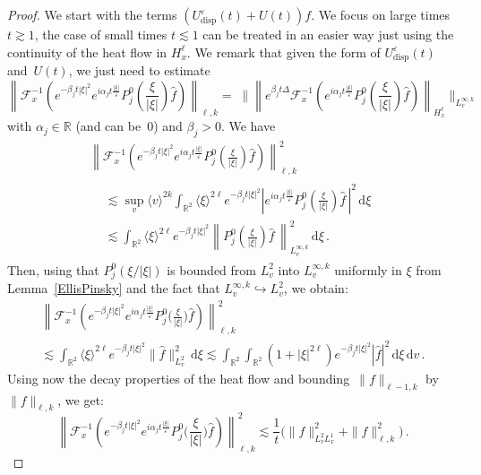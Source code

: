 \documentclass[11pt]{article}
\theoremstyle{definition}
\numberwithin{equation}{section}
\numberwithin{figure}{section}
\numberwithin{table}{section}
\newcommand*{\dd}{\mathrm{d}}
\newcommand*{\dv}{\dd v}
\newcommand*{\dxi}{\dd \xi}
\newcommand*\R {\mathbb{R}}
\newcommand*\eps{{\varepsilon}}
\DeclareMathOperator{\disp}{disp}
\begin{document}
\begin{proof}
We start with the terms $(U^\eps_{\disp}(t)+U(t))f$. We focus on large times~$t \gtrsim 1$, the case of small times $t \lesssim 1$ can be treated in an easier way just using the continuity of the heat flow in $H^\ell_x$. We remark that given the form of $U^\eps_{\disp}(t)$ and~$U(t)$, we just need to estimate
\[
\left\| \mathcal{F}_x^{-1} \left(e^{-\beta_j t|\xi|^2} e^{i \alpha_j t \frac{|\xi|}{\eps}} P^0_j{\left(\frac{\xi}{|\xi|} \right)} \widehat f \right) \right\|_{\ell,k} 
= \;\bigg\| \left\| e^{\beta_j t \Delta} \mathcal{F}_x^{-1} \left(e^{i \alpha_j t \frac{|\xi|}{\eps}} P^0_j\left(\frac{\xi}{|\xi|} \right) \widehat f \right)\right\|_{H^\ell_x} \bigg\|_{L^{\infty,k}_v}
\]
with $\alpha_j \in \R$ (and can be~0) and $\beta_j>0$. We have
\begin{multline*}
\left\| \mathcal{F}_x^{-1} \left(e^{-\beta_j t|\xi|^2} e^{i \alpha_j t \frac{|\xi|}{\eps}} P^0_j \left(\frac{\xi}{|\xi|} \right) \widehat f \right) \right\|^2_{\ell,k} \\
\begin{aligned}
& \lesssim \sup_v \langle v \rangle^{2k} \int_{\R^2} \langle \xi \rangle^{2\ell} e^{-\beta_j t|\xi|^2} \left| e^{i \alpha_j t \frac{|\xi|}{\eps}} P^0_j\left(\frac{\xi}{|\xi|} \right) \widehat f\,\right|^2 \, \dxi \\
&\lesssim \int_{\R^2} \langle \xi \rangle^{2\ell}e^{-\beta_j t|\xi|^2} \left\|P^0_j\left(\frac{\xi}{|\xi|} \right) \widehat f\, \right\|^2_{L^{\infty,k}_v} \, \dxi \,.
\end{aligned}
\end{multline*}
Then, using that $P_{j}^0(\xi/|\xi|)$ is bounded from $L^2_v$ into $L^{\infty,k}_v$ uniformly in $\xi$ from Lemma~\ref{EllisPinsky} and the fact that $L^{\infty,k}_v \hookrightarrow L^2_v$, we obtain:
\begin{multline*}
\left\| \mathcal{F}_x^{-1} \left(e^{-\beta_j t|\xi|^2} e^{i \alpha_j t \frac{|\xi|}{\eps}} P^0_j\Big(\frac{\xi}{|\xi|} \Big) \widehat f \right) \right\|_{\ell,k}^2 \\
\lesssim \int_{\R^2} \langle \xi \rangle^{2\ell} e^{-\beta_j t|\xi|^2} \| \widehat f \|^2_{L^2_v} \, \dxi \lesssim \int_{\R^2}
\int_{\R^2} (1+|\xi|^{2\ell}) e^{-\beta_j t|\xi|^2} \left|\widehat f\right|^2\, \dxi \, \dv \,.
\end{multline*}
Using now the decay properties of the heat flow and bounding~$ \|f\| _{\ell-1,k} $ by~$ \|f\| _{\ell,k}$, we get:
\[
\left\| \mathcal{F}_x^{-1} \left(e^{-\beta_j t|\xi|^2} e^{i \alpha_j t \frac{|\xi|}{\eps}} P^0_j\Big(\frac{\xi}{|\xi| }\Big) \widehat f \right) \right\|_{\ell,k}^2 \lesssim \frac{1}{t} \big(\|f\|^2_{L^2_v L^1_x} + \|f\|^2_{\ell,k}\big) \,.
\]
\end{proof}
\end{document}
